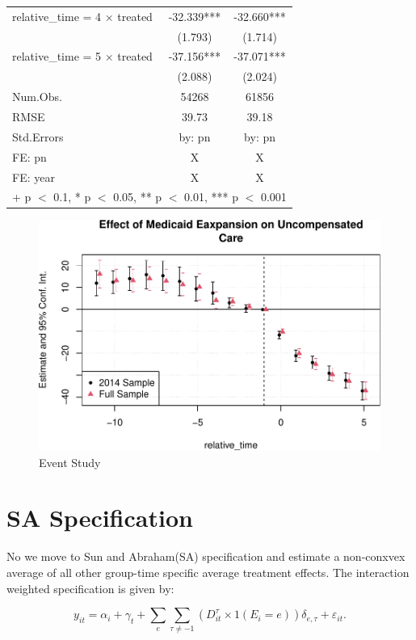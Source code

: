 \documentclass[
  12pt,
]{article}
\begin{document}
\begin{table}
\begin{tabular}[t]{lcc}
relative\_time = 4 × treated & -32.339*** & -32.660***\\
 & (1.793) & (1.714)\\
relative\_time = 5 × treated & -37.156*** & -37.071***\\
 & (2.088) & (2.024)\\
\midrule
Num.Obs. & 54268 & 61856\\
RMSE & 39.73 & 39.18\\
Std.Errors & by: pn & by: pn\\
FE: pn & X & X\\
FE: year & X & X\\
\bottomrule
\multicolumn{3}{l}{\rule{0pt}{1em}+ p $<$ 0.1, * p $<$ 0.05, ** p $<$ 0.01, *** p $<$ 0.001}\\
\end{tabular}
\end{table}

\begin{figure}
\centering
\includegraphics{Report_files/figure-latex/Fig-3-1.pdf}
\caption{Event Study}
\end{figure}

\newpage

\hypertarget{sa-specification}{%
\section{SA Specification}\label{sa-specification}}

No we move to Sun and Abraham(SA) specification and estimate a
non-conxvex average of all other group-time specific average treatment
effects. The interaction weighted specification is given by:

\begin{equation}\label{eq:iwevent}
y_{it} = \alpha_{i} + \gamma_{t} +\sum_{e} \sum_{\tau \neq -1} \left(D_{it}^{\tau} \times 1(E_{i}=e)\right) \delta_{e, \tau} + \varepsilon_{it}.
\end{equation}
\end{document}

